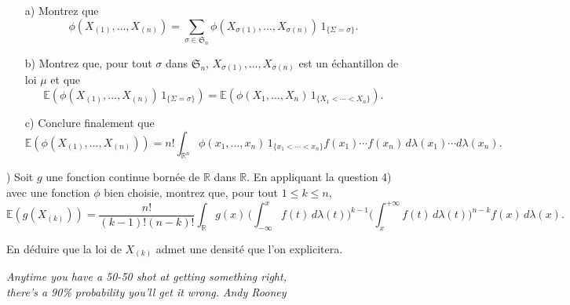 \documentclass[12pt,a4paper]{article}
\begin{document}
\begin{itemize}
    \item[a)] Montrez que
    \[
    \phi(X_{(1)}, \dots, X_{(n)}) = \sum_{\sigma \in \mathfrak{S}_n} \phi(X_{\sigma(1)}, \dots, X_{\sigma(n)}) \, 1_{\{ \Sigma = \sigma \}}.
    \]

    \item[b)] Montrez que, pour tout $\sigma$ dans $\mathfrak{S}_n$, $X_{\sigma(1)}, \dots, X_{\sigma(n)}$ est un échantillon de loi $\mu$ et que
    \[
    \mathbb{E}\!\left(\phi(X_{(1)}, \dots, X_{(n)}) \, 1_{\{ \Sigma = \sigma \}}\right)
    = \mathbb{E}\!\left( \phi(X_1, \dots, X_n) \, 1_{\{ X_1 < \cdots < X_n \}} \right).
    \]

    \item[c)] Conclure finalement que
    \[
    \mathbb{E}(\phi(X_{(1)}, \dots, X_{(n)})) = n! \int_{\mathbb{R}^n} \phi(x_1, \dots, x_n) \, 1_{\{x_1 < \cdots < x_n\}} f(x_1) \cdots f(x_n) \, d\lambda(x_1) \cdots d\lambda(x_n).
    \]
\end{itemize}

\medskip

) Soit $g$ une fonction continue bornée de $\mathbb{R}$ dans $\mathbb{R}$. En appliquant la question 4) avec une fonction $\phi$ bien choisie, montrez que, pour tout $1 \leq k \leq n$,
\[
\mathbb{E}(g(X_{(k)})) = \frac{n!}{(k-1)! (n-k)!} \int_{\mathbb{R}} g(x) \, \bigg( \int_{-\infty}^x f(t) \, d\lambda(t) \bigg)^{k-1} \bigg( \int_{x}^{+\infty} f(t) \, d\lambda(t) \bigg)^{n-k} f(x) \, d\lambda(x).
\]

\noindent
En déduire que la loi de $X_{(k)}$ admet une densité que l’on explicitera.

\bigskip

\noindent
\emph{Anytime you have a 50-50 shot at getting something right,\\
there’s a 90\% probability you’ll get it wrong.}
\hfill \emph{Andy Rooney}
\end{document}
